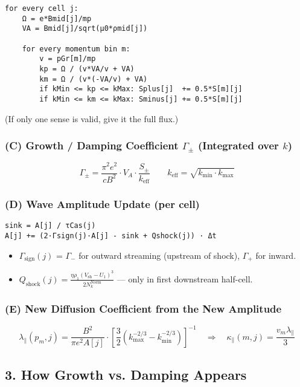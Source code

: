 \begin{verbatim}
for every cell j:
    Ω = e*Bmid[j]/mp
    VA = Bmid[j]/sqrt(μ0*ρmid[j])

    for every momentum bin m:
        v = pGr[m]/mp
        kp = Ω / (v*VA/v + VA)
        km = Ω / (v*(-VA/v) + VA)
        if kMin <= kp <= kMax: Splus[j]  += 0.5*S[m][j]
        if kMin <= km <= kMax: Sminus[j] += 0.5*S[m][j]
\end{verbatim}

(If only one sense is valid, give it the full flux.)

\subsubsection*{(C) Growth / Damping Coefficient $\Gamma_\pm$ (Integrated over $k$)}

\[
\Gamma_\pm = \frac{\pi^2 e^2}{c B^2} \cdot V_A \cdot \frac{S_\pm}{k_{\text{eff}}}
\qquad
k_{\text{eff}} = \sqrt{k_{\min} \cdot k_{\max}}
\]

\subsubsection*{(D) Wave Amplitude Update (per cell)}

\begin{verbatim}
sink = A[j] / τCas(j)
A[j] += (2·Γsign(j)·A[j] - sink + Qshock(j)) · Δt
\end{verbatim}

\begin{itemize}
\item $\Gamma_{\text{sign}}(j)$ = $\Gamma_-$ for outward streaming (upstream of shock), $\Gamma_+$ for inward.
\item $Q_{\text{shock}}(j) = \frac{\eta \rho_1 (V_{\text{sh}} - U_1)^3}{2 N_k^{\text{Norm}}}$ — only in first downstream half-cell.
\end{itemize}

\subsubsection*{(E) New Diffusion Coefficient from the New Amplitude}

\[
\lambda_\parallel(p_m, j) =
\frac{B^2}{\pi e^2 A[j]} \cdot \left[ \frac{3}{2} \left(k_{\max}^{-2/3} - k_{\min}^{-2/3}\right) \right]^{-1}
\quad\Rightarrow\quad
\kappa_\parallel(m, j) = \frac{v_m \lambda_\parallel}{3}
\]

\subsection*{3. How Growth vs. Damping Appears}

